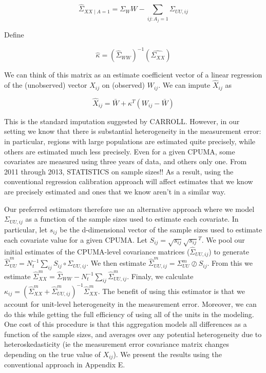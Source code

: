 \documentclass[12pt]{article}
\begin{document}
$$
\hat{\Sigma}_{XX \mid A = 1} = \Sigma_WW - \sum_{ij: A_j = 1} \Sigma_{UU, ij}
$$

Define

$$
\hat{\kappa} = (\hat{\Sigma}_{WW})^{-1}(\hat{\Sigma_{XX}})
$$

We can think of this matrix as an estimate coefficient vector of a linear regression of the (unobserved) vector $X_{ij}$ on (observed) $W_{ij}$. We can impute $\hat{X}_{ij}$ as

$$
\hat{X}_{ij} = \bar{W} + \kappa^T(W_{ij} - \bar{W})
$$

This is the standard imputation suggested by CARROLL. However, in our setting we know that there is substantial heterogeneity in the measurement error: in particular, regions with large populations are estimated quite precisely, while others are estimated much less precisely. Even for a given CPUMA, some covariates are measured using three years of data, and others only one. From 2011 through 2013, STATISTICS on sample sizes!! As a result, using the conventional regression calibration approach will affect estimates that we know are precisely estimated and ones that we know aren't in a similar way. 

Our preferred estimators therefore use an alternative approach where we model $\Sigma_{UU, ij}$ as a function of the sample sizes used to estimate each covariate. In particular, let $s_{ij}$ be the d-dimensional vector of the sample sizes used to estimate each covariate value for a given CPUMA. Let $S_{ij} = \sqrt{s_{ij}}\sqrt{s_{ij}}^T$. We pool our initial estimates of the CPUMA-level covariance matrices ($\hat{\Sigma}_{UU, ij}$) to generate $\hat{\Sigma}_{UU}^m = N_t^{-1}\sum_{ij} S_{ij} \circ \Sigma_{UU, ij}$. We then estimate $\hat{\Sigma}_{UU, ij}^m = \Sigma_{UU}^m \oslash S_{ij}$. From this we estimate $\hat{\Sigma}^m_{XX} = \hat{\Sigma}_{WW} - N_t^{-1}\sum_{ij}\hat{\Sigma}^m_{UU, ij}$. Finaly, we calculate $\kappa_{ij} = (\hat{\Sigma}^m_{XX} + \hat{\Sigma}^m_{UU, ij})^{-1}\hat{\Sigma}^m_{XX}$. The benefit of using this estimator is that we account for unit-level heterogeneity in the measurement error. Moreover, we can do this while getting the full efficiency of using all of the units in the modeling. One cost of this procedure is that this aggregation models all differences as a function of the sample sizes, and averages over any potential heterogeneity due to heteroskedasticity (ie the measurement error covariance matrix changes depending on the true value of $X_{ij}$). We present the results using the conventional approach in Appendix E.
\end{document}
